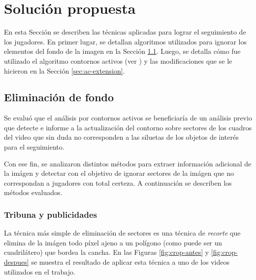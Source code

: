 \chapter{Solución propuesta}
\label{chap-solution}

En esta Sección se describen las técnicas aplicadas para lograr el seguimiento
de los jugadores. En primer lugar, se detallan algoritmos utilizados para
ignorar los elementos del fondo de la imagen en la Sección
\ref{sec:background-elimination}. Luego, se detalla cómo fue utilizado el
algoritmo contornos activos (ver \cite{fast-level-set}) y las modificaciones
que se le hicieron en la Sección \ref{sec:ac-extension}.

\section{Eliminación de fondo}

\label{sec:background-elimination}
Se evaluó que el análisis por contornos activos se beneficiaría de un análisis
previo que detecte e informe a la actualización del contorno sobre sectores de
los cuadros del video que sin duda no corresponden a las siluetas de los
objetos de interés para el seguimiento.

Con ese fin, se analizaron distintos métodos para extraer información adicional
de la imágen y detectar con el objetivo de ignorar sectores de la imágen que no
correspondan a jugadores con total certeza. A continuación se describen los
métodos evaluados.

\subsection{Tribuna y publicidades}
\label{subsec:crop-tribunas}

La técnica más simple de eliminación de sectores es una técnica de
\textit{recorte} que elimina de la imágen todo píxel ajeno a un polígono
(como puede ser un cuadrilátero) que bordea la cancha. En las Figuras
\ref{fig:crop-antes} y \ref{fig:crop-despues} se muestra el resultado
de aplicar esta técnica a uno de los videos utilizados en el trabajo.

